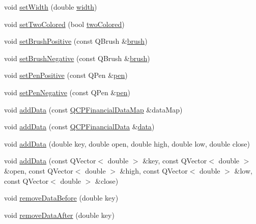 \begin{DoxyCompactItemize}
\item 
void \hyperlink{classQCPFinancial_a99633f8bac86a61d534ae5eeb1a3068f}{set\+Width} (double \hyperlink{classQCPFinancial_a71ccaa04cdade0ec08a2117db6e4a4ce}{width})
\item 
void \hyperlink{classQCPFinancial_a138e44aac160a17a9676652e240c5f08}{set\+Two\+Colored} (bool \hyperlink{classQCPFinancial_a2bab30fc4eee38a0da3a05846b8d7ac7}{two\+Colored})
\item 
void \hyperlink{classQCPFinancial_a5ebff2b1764efd07cc44942e67821829}{set\+Brush\+Positive} (const Q\+Brush \&\hyperlink{classQCPAbstractPlottable_aa74cdceb9c7286ef116fbfa58e0326e7}{brush})
\item 
void \hyperlink{classQCPFinancial_a8bbdd87629f9144b3ef51af660c0961a}{set\+Brush\+Negative} (const Q\+Brush \&\hyperlink{classQCPAbstractPlottable_aa74cdceb9c7286ef116fbfa58e0326e7}{brush})
\item 
void \hyperlink{classQCPFinancial_ac58aa3adc7a35aab0088764b840683e5}{set\+Pen\+Positive} (const Q\+Pen \&\hyperlink{classQCPAbstractPlottable_a41d060007cc6b3037c9c04d22d0c0398}{pen})
\item 
void \hyperlink{classQCPFinancial_afe5c07e94ccea01a75b3a2476993c346}{set\+Pen\+Negative} (const Q\+Pen \&\hyperlink{classQCPAbstractPlottable_a41d060007cc6b3037c9c04d22d0c0398}{pen})
\item 
void \hyperlink{classQCPFinancial_a1a83396f97fcc68f2b7aa8d9782feffe}{add\+Data} (const \hyperlink{qcustomplot_8h_a745c09823fae0974b50beca9bc3b3d7d}{Q\+C\+P\+Financial\+Data\+Map} \&data\+Map)
\item 
void \hyperlink{classQCPFinancial_a3b6144b48a6a8e63236fc5bf70d40c00}{add\+Data} (const \hyperlink{classQCPFinancialData}{Q\+C\+P\+Financial\+Data} \&\hyperlink{classQCPFinancial_a58e05aefa057d16edfcc0334cf81c241}{data})
\item 
void \hyperlink{classQCPFinancial_a688bbd052e00a02954ddb0068b378170}{add\+Data} (double key, double open, double high, double low, double close)
\item 
void \hyperlink{classQCPFinancial_aa1abe3bdafb297497f09cdbdc4db3958}{add\+Data} (const Q\+Vector$<$ double $>$ \&key, const Q\+Vector$<$ double $>$ \&open, const Q\+Vector$<$ double $>$ \&high, const Q\+Vector$<$ double $>$ \&low, const Q\+Vector$<$ double $>$ \&close)
\item 
void \hyperlink{classQCPFinancial_a097c0383c7c1e9042ca7f93cb439d15a}{remove\+Data\+Before} (double key)
\item 
void \hyperlink{classQCPFinancial_aa0fcd357005288c833a230c7874825ba}{remove\+Data\+After} (double key)

\end{DoxyCompactItemize}
